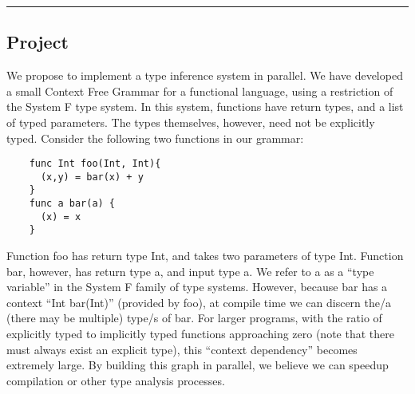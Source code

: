 \documentclass{article}[9pt]
\newenvironment{Figure}
  {\par\medskip\noindent\minipage{\linewidth}}
  {\endminipage\par\medskip}
\begin{document}
\thispagestyle{empty}
\noindent{}
\noindent{}

\vspace{1em}

\noindent{}
\rule{\textwidth}{1pt}

\begin{multicols}{2}

\section*{Project}
We propose to implement a type inference system in parallel. We have
developed a small Context Free Grammar for a functional language,
using a restriction of the System F type system. In this system,
functions have return types, and a list of typed parameters. The types
themselves, however, need not be explicitly typed. Consider the
following two functions in our grammar: 
\begin{Figure}
  \begin{lstlisting}
    func Int foo(Int, Int){
      (x,y) = bar(x) + y
    }
    func a bar(a) {
      (x) = x
    }
  \end{lstlisting}
\end{Figure}
\noindent Function foo has return type Int, and takes two parameters of type
Int. Function bar, however, has return type a, and input type a. We
refer to a as a ``type variable'' in the System F family of type
systems. However, because bar has a context ``Int bar(Int)'' (provided
by foo), at compile time we can discern the/a  (there may be multiple)
type/s of bar. For larger programs, with the ratio of explicitly typed
to implicitly typed functions approaching zero (note that there must
always exist an explicit type), this ``context dependency'' becomes
extremely large. By building this graph in parallel, we believe we can
speedup compilation or other type analysis processes. 


\end{multicols}
\end{document}
